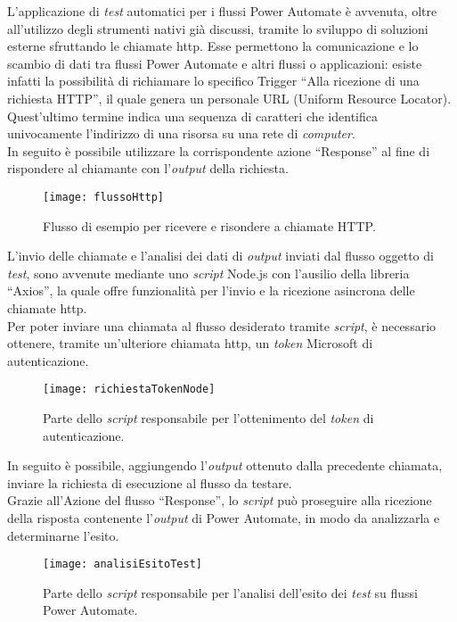 L'applicazione di \emph{test} automatici per i flussi Power Automate è avvenuta, oltre all'utilizzo degli strumenti nativi già discussi, tramite lo sviluppo di soluzioni esterne sfruttando le chiamate \gls{http}.
Esse permettono la comunicazione e lo scambio di dati tra flussi Power Automate e altri flussi o applicazioni: esiste infatti la possibilità di richiamare lo specifico Trigger “Alla ricezione di una richiesta HTTP”, il quale genera un personale URL (Uniform Resource Locator).
Quest'ultimo termine indica una sequenza di caratteri che identifica univocamente l'indirizzo di una risorsa su una rete di \emph{computer}.\\
In seguito è possibile utilizzare la corrispondente azione “Response” al fine di rispondere al chiamante con l'\emph{output} della richiesta.\\
\begin{figure}[htbp] 
    \centering 
    \texttt{[image: flussoHttp]} 
    \caption{Flusso di esempio per ricevere e risondere a chiamate HTTP.}
    \label{fig:flussoHttp}
\end{figure}
\newline L'invio delle chiamate e l'analisi dei dati di \emph{output} inviati dal flusso oggetto di \emph{test}, sono avvenute mediante uno \emph{script} Node.js con l'ausilio della libreria “Axios”, la quale offre funzionalità per l'invio e la ricezione asincrona delle chiamate \gls{http}.\\
Per poter inviare una chiamata al flusso desiderato tramite \emph{script}, è necessario ottenere, tramite un'ulteriore chiamata \gls{http}, un \emph{token} Microsoft di autenticazione.
\begin{figure}[htbp] 
    \centering 
    \texttt{[image: richiestaTokenNode]} 
    \caption{Parte dello \emph{script} responsabile per l'ottenimento del \emph{token} di autenticazione.}
    \label{fig:richiestaTokenNode}
\end{figure}
\newline In seguito è possibile, aggiungendo l'\emph{output} ottenuto dalla precedente chiamata, inviare la richiesta di esecuzione al flusso da testare.\\
Grazie all'Azione del flusso “Response”, lo \emph{script} può proseguire alla ricezione della risposta contenente l'\emph{output} di Power Automate, in modo da analizzarla e determinarne l'esito.
\begin{figure}[htbp] 
    \centering 
    \texttt{[image: analisiEsitoTest]} 
    \caption{Parte dello \emph{script} responsabile per l'analisi dell'esito dei \emph{test} su flussi Power Automate.}
    \label{fig:analisiEsitoTest}
\end{figure}
